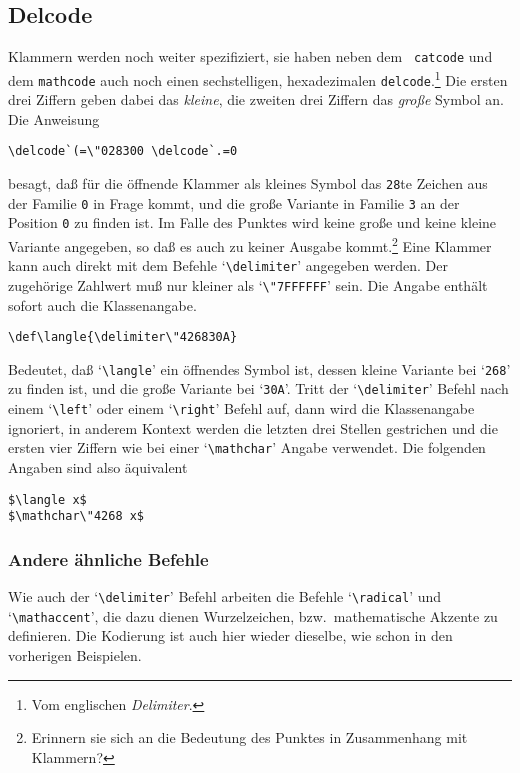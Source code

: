 \subsection{Delcode}
Klammern werden noch weiter spezifiziert, sie haben neben dem {\tt
catcode} und dem {\tt mathcode} auch noch einen sechstelligen,
hexadezimalen {\tt delcode}.\footnote{Vom englischen 
{\em Delimiter}.}
Die ersten drei 
Ziffern geben dabei das {\em kleine}, die zweiten drei
Ziffern das {\em gro\ss{}e} Symbol an. Die Anweisung
\begin{verbatim}
\delcode`(=\"028300 \delcode`.=0
\end{verbatim}
besagt, da\ss{} f\"ur die \"offnende Klammer als kleines Symbol das {\tt 28}te
Zeichen aus der 
Familie {\tt0} in Frage kommt, und die gro\ss{}e Variante
in Familie {\tt3} an der Position {\tt0} zu finden ist. Im Falle des
Punktes wird keine gro\ss{}e und keine kleine Variante angegeben, so da\ss{}
es auch zu keiner 
Ausgabe kommt.\footnote{Erinnern sie sich an die
Bedeutung des Punktes in Zusammenhang mit Klammern?} Eine Klammer kann
auch direkt mit dem Befehle 
`\verb|\delimiter|' angegeben werden. Der
zugeh\"orige Zahlwert mu\ss{} nur kleiner als `\verb|\"7FFFFFF|' sein. Die
Angabe enth\"alt sofort auch die Klassenangabe.
\begin{verbatim}
\def\langle{\delimiter\"426830A}
\end{verbatim}
Bedeutet, da\ss{} 
`\verb|\langle|' ein \"offnendes Symbol ist, dessen kleine
Variante bei `\verb|268|' zu finden ist, und die gro\ss{}e Variante bei
`\verb|30A|'. Tritt der `\verb|\delimiter|' Befehl nach einem
`\verb|\left|' oder einem `\verb|\right|' Befehl auf, dann wird die
Klassenangabe ignoriert, in anderem Kontext werden die letzten drei
Stellen gestrichen und die ersten vier Ziffern wie bei einer
`\verb|\mathchar|'  Angabe verwendet. Die folgenden Angaben sind also
\"aquivalent
\begin{verbatim}
$\langle x$
$\mathchar\"4268 x$
\end{verbatim}
\subsubsection{Andere \"ahnliche Befehle}
Wie auch der `\verb|\delimiter|' Befehl arbeiten die Befehle
`\verb|\radical|' und 
`\verb|\mathaccent|', die dazu dienen
Wurzelzeichen, bzw.\ mathematische 
Akzente zu definieren. Die
Kodierung ist auch hier wieder dieselbe, wie schon in den vorherigen
Beispielen.
